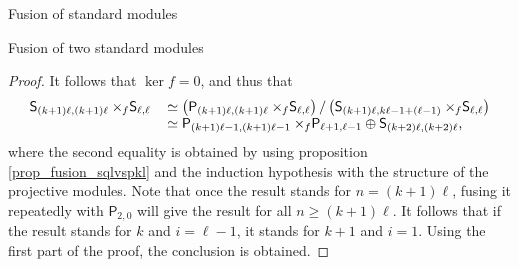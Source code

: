 \documentclass[reqno]{amsart}
\newcommand{\ds}[1]{\mathsf S_{#1}}
\newcommand{\dP}[1]{\mathsf P_{#1}}
\newcommand{\xf}{\times\hspace{-0.27em}_f}
\newcommand{\lc}{\ell}
\begin{document}
\begin{section}{Fusion of standard modules}
\begin{subsection}{Fusion of two standard modules}
\begin{proof}
It follows that $\ker f =0$, and thus that
\begin{equation}
\begin{tabular}{r l}
$\ds{(k+1) \lc,(k+1) \lc} \xf \ds{\lc,\lc} $&$\simeq \left(\dP{(k+1)\lc,(k+1)\lc} \xf \ds{\lc,\lc}\right)/ \left(\ds{(k+1) \lc, k \lc -1 + (\lc-1)}\xf \ds{\lc,\lc} \right)$\\
& $\simeq \dP{(k+1)\lc-1, (k+1)\lc -1} \xf \dP{\lc+1, \lc -1} \oplus \ds{(k+2)\lc,(k+2)\lc}$, 
\end{tabular}
\end{equation}
where the second equality is obtained by using proposition \ref{prop_fusion_sqlvspkl} and the induction hypothesis with the structure of the projective modules. Note that once the result stands for $n= (k+1)\lc$, fusing it repeatedly with $\dP{2,0}$ will give the result for all $n\geq (k+1)\lc$. It follows that if the result stands for $k$ and $i=\lc-1$, it stands for $k+1$ and $i=1$. Using the first part of the proof, the conclusion is obtained.
\end{proof}


\end{subsection}
\end{section}
\end{document}
